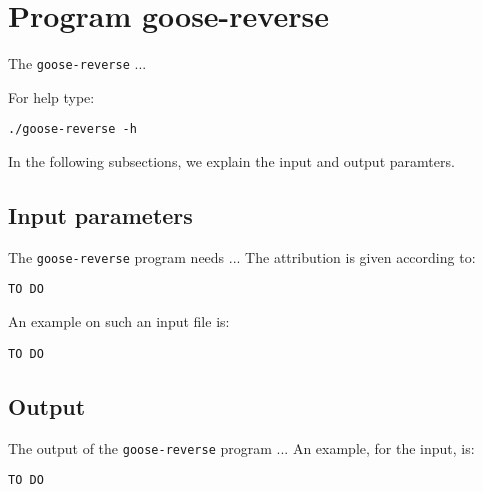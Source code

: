 \section{Program goose-reverse}
The \texttt{goose-reverse} ...

For help type:
\begin{lstlisting}
./goose-reverse -h
\end{lstlisting}
In the following subsections, we explain the input and output paramters.

\subsection*{Input parameters}

The \texttt{goose-reverse} program needs ...
The attribution is given according to:
\begin{lstlisting}
TO DO
\end{lstlisting}

An example on such an input file is:
\begin{lstlisting}
TO DO
\end{lstlisting}

\subsection*{Output}
The output of the \texttt{goose-reverse} program ...
An example, for the input, is:
\begin{lstlisting}
TO DO
\end{lstlisting}
